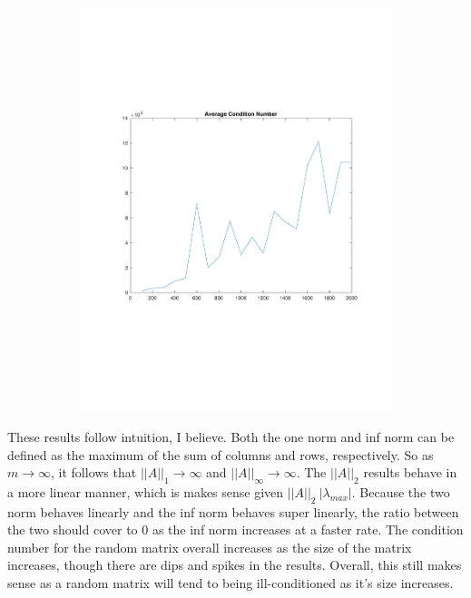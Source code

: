 \documentclass{article}
\begin{document}
\begin{figure}[H]
\begin{subfigure}{0.48\textwidth}
\includegraphics[width=\linewidth]{condition}	
\end{subfigure}

\end{figure}



These results follow intuition, I believe. 
Both the one norm and inf norm can be defined as the maximum of the sum of columns and rows, respectively.
So as $m \to \infty$, it follows that $||A||_1 \to \infty$ and $||A||_{\infty} \to \infty$.
The $||A||_2$ results behave in a more linear manner, which is makes sense given $||A||_2 \ |\lambda_{max}|$. 
Because the two norm behaves linearly and the inf norm behaves super linearly, the ratio between the two should cover to 0 as the inf norm increases at a faster rate.
The condition number for the random matrix overall increases as the size of the matrix increases, though there are dips and spikes in the results.
Overall, this still makes sense as a random matrix will tend to being ill-conditioned as it's size increases. 
\end{document}
